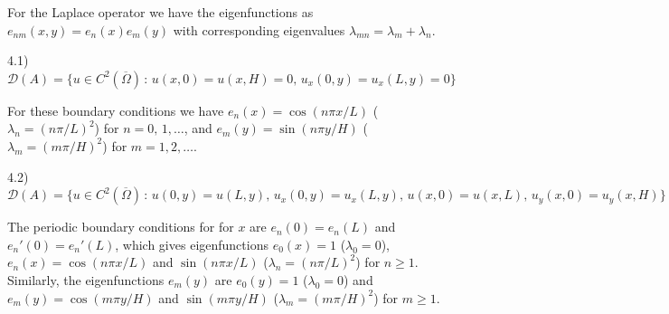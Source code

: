 
For the Laplace operator we have the eigenfunctions as $e_{nm}(x,y) = e_{n}(x) e_{m}(y)$ with corresponding eigenvalues $\lambda_{mn} = \lambda_{m} + \lambda_{n}$.

4.1) $\mathcal{D}(A) = \{ u \in C^2(\overline{\Omega}) \,:\, u(x,0) = u(x,H) = 0,\, u_{x}(0,y) = u_{x}(L,y) = 0 \}$

For these boundary conditions we have $e_{n}(x) = \cos{(n \pi x/L)}$ ($\lambda_{n} = (n \pi/L)^2$) for $n = 0,\,1,\ldots$, and $e_{m}(y) = \sin{(n \pi y/H)}$ ($\lambda_{m} = (m \pi/H)^2$) for $m = 1,2,\ldots$.


4.2) $\mathcal{D}(A) = \{ u \in C^2(\overline{\Omega}) \,:\, u(0,y)=u(L,y), \, u_{x}(0,y)=u_{x}(L,y), \, u(x,0)=u(x,L), \, u_{y}(x,0)=u_{y}(x,H) \}$

The periodic boundary conditions for for $x$ are $e_{n}(0) = e_{n}(L)$ and $e_{n}'(0) = e_{n}'(L)$, which gives eigenfunctions $e_{0}(x) = 1$ ($\lambda_{0} = 0$), $e_{n}(x) = \cos{(n \pi x / L)}$ and $\sin{(n\pi x/L)}$ ($\lambda_{n} = (n \pi / L)^2$) for $n \geq 1$.
Similarly, the eigenfunctions $e_{m}(y)$ are $e_{0}(y) = 1$ ($\lambda_{0} = 0$) and $e_{m}(y) = \cos{(m\pi y/H)}$ and $\sin{(m \pi y/H)}$ ($\lambda_{m} = (m\pi/H)^2$) for $m \geq 1$.




